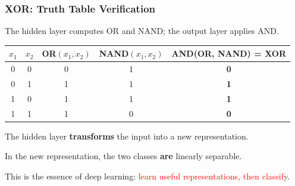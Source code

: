 \documentclass[notes,11pt, aspectratio=169]{beamer}
\newenvironment{wideitemize}{\itemize\addtolength{\itemsep}{10pt}}{\enditemize}
\begin{document}
\begin{frame}
\frametitle{XOR: Truth Table Verification}

The hidden layer computes OR and NAND; the output layer applies AND.

\vspace{10pt}
\begin{center}
\renewcommand{\arraystretch}{1.4}
\begin{tabular}{cc|c|c|c}
    \toprule
    $x_1$ & $x_2$ & OR$(x_1,x_2)$ & NAND$(x_1,x_2)$ & AND(OR, NAND) = \textbf{XOR} \\
    \midrule
    0 & 0 & 0 & 1 & \textbf{0} \\
    0 & 1 & 1 & 1 & \textbf{1} \\
    1 & 0 & 1 & 1 & \textbf{1} \\
    1 & 1 & 1 & 0 & \textbf{0} \\
    \bottomrule
\end{tabular}
\end{center}

\vspace{10pt}
\begin{wideitemize}
    \item The hidden layer \textbf{transforms} the input into a new representation.
    \item In the new representation, the two classes \textbf{are} linearly separable.
    \item This is the essence of deep learning: \textcolor{red}{learn useful representations, then classify}.
\end{wideitemize}
\end{frame}
\end{document}
